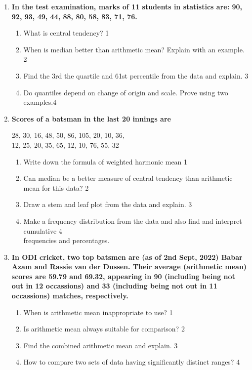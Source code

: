 \documentclass[a4paper,oneside]{book}
\begin{document}
\begin{enumerate}
    \item
  \textbf{In the test examination, marks of 11 students in statistics are: 90, 92, 93, 49, 44, 88, 80, 58, 83, 71, 76.}
  \begin{enumerate}
    \item
	What is central tendency? \hfill 1
    \item
	When is median better than arithmetic mean? Explain with an example. \hfill 2
    \item  
	Find the 3rd the quartile and 61st percentile from the data and explain.  \hfill 3
    \item
	Do quantiles depend on change of origin and scale. Prove using two examples.\hfill 4
\end{enumerate}

      \item
  \textbf{Scores of a batsman in the last 20 innings are} 
   \begin{center}
  	 28, 30, 16, 48, 50, 86, 105, 20, 10, 36, \\
  	 12, 25, 20, 35, 65, 12, 10, 76, 55, 32
  	 \end{center}
  \begin{enumerate}
    \item
	Write down the formula of weighted harmonic mean \hfill 1
    \item
	Can median be a better measure of central tendency than arithmetic mean for this data?  \hfill 2
    \item  
	Draw a stem and leaf plot from the data and explain.  \hfill 3
    \item
	Make a frequency distribution from the data and also find and interpret cumulative  \hfill 4 \\ frequencies and percentages.
\end{enumerate}

 \item
	  \textbf{In ODI cricket, two top batsmen are (as of 2nd Sept, 2022) Babar Azam and Rassie van der Dussen. Their average (arithmetic mean) scores are 59.79 and 69.32, appearing in 90 (including being not out in 12 occassions) and 33 (including being not out in 11 occassions) matches, respectively.} 
  
  \begin{enumerate}
    \item
	When is arithmetic mean inappropriate to use? \hfill 1
    \item
	Is arithmetic mean always suitable for comparison? \hfill 2
    \item  
	Find the combined arithmetic mean and explain. \hfill 3
    \item
	How to compare two sets of data having significantly distinct ranges? \hfill 4
  \end{enumerate}
  

\end{enumerate}
\end{document}
